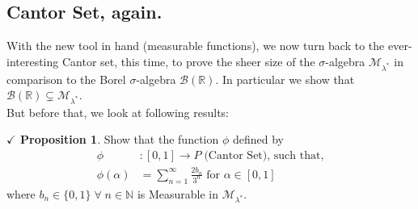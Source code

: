 \documentclass{article}
\theoremstyle{definition}
\theoremstyle{remark}
\theoremstyle{definition}
\theoremstyle{definition}
\newtheorem{proposition}{$\checkmark$ Proposition}
\theoremstyle{definition}
\newcommand{\R}{\mathbb{R}}
\newcommand{\N}{\mathbb{N}}
\newcommand{\bor}[1]{\mathscr{B}(#1)}
\newcommand{\set}[1]{\mathscr{#1}}
\newcommand{\msigm}[1]{\set{M}_{#1}}
\begin{document}
\subsection{Cantor Set, again.}
With the new tool in hand (measurable functions), we now turn back to the ever-interesting Cantor set, this time, to prove the sheer size of the $ \sigma $-algebra $ \msigm{\lambda^*} $ in comparison to the Borel $ \sigma $-algebra $ \bor{\R} $. In particular we show that $ \bor{\R} \subsetneq \msigm{\lambda^*} $.\\
But before that, we look at following results:
\begin{proposition}
	Show that the function $ \phi $ defined by
	\begin{equation*}
		\begin{split}
			\phi &: [0,1]\longrightarrow P\;\text{(Cantor Set), such that,}\\
			\phi(\alpha) &= \sum_{n=1}^{\infty} \frac{2b_n}{3^n}\;\text{for }\alpha\in[0,1]
		\end{split}
	\end{equation*} 
where $ b_n \in \{0,1\}\;\forall \; n\in\N$ is Measurable in $ \msigm{\lambda^*} $.
\end{proposition}
\end{document}
